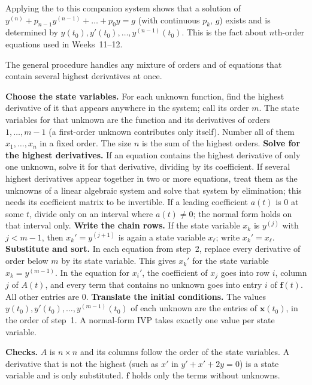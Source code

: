 \documentclass[10pt]{scrartcl}
\newcommand{\vv}[1]{\mathbf{#1}}
\newenvironment{howto}[1]{\begin{mdframed}[style=howtostyle,frametitle={#1}]}{\end{mdframed}}
\begin{document}
\noindent Applying the  to this companion system shows that a solution of $y^{(n)}+p_{n-1}y^{(n-1)}+\dots+p_0y=g$ (with continuous $p_k$, $g$) exists and is determined by $y(t_0),y'(t_0),\dots,y^{(n-1)}(t_0)$. This is the fact about $n$th-order equations used in Weeks~11--12.

The general procedure handles any mixture of orders and of equations that contain several highest derivatives at once.

\begin{howto}{How to put a system in normal form}
  \begin{steps}
    \ii \textbf{Choose the state variables.} For each unknown function, find the highest derivative of it that appears anywhere in the system; call its order $m$. The state variables for that unknown are the function and its derivatives of orders $1,\dots,m-1$ (a first-order unknown contributes only itself). Number all of them $x_1,\dots,x_n$ in a fixed order. The size $n$ is the sum of the highest orders.
    \ii \textbf{Solve for the highest derivatives.} If an equation contains the highest derivative of only one unknown, solve it for that derivative, dividing by its coefficient. If several highest derivatives appear together in two or more equations, treat them as the unknowns of a linear algebraic system and solve that system by elimination; this needs its coefficient matrix to be invertible. If a leading coefficient $a(t)$ is $0$ at some $t$, divide only on an interval where $a(t)\neq 0$; the normal form holds on that interval only.
    \ii \textbf{Write the chain rows.} If the state variable $x_k$ is $y^{(j)}$ with $j<m-1$, then $x_k'=y^{(j+1)}$ is again a state variable $x_\ell$; write $x_k'=x_\ell$.
    \ii \textbf{Substitute and sort.} In each equation from step~2, replace every derivative of order below $m$ by its state variable. This gives $x_k'$ for the state variable $x_k=y^{(m-1)}$. In the equation for $x_i'$, the coefficient of $x_j$ goes into row $i$, column $j$ of $A(t)$, and every term that contains no unknown goes into entry $i$ of $\vv f(t)$. All other entries are $0$.
    \ii \textbf{Translate the initial conditions.} The values $y(t_0),y'(t_0),\dots,y^{(m-1)}(t_0)$ of each unknown are the entries of $\vv x(t_0)$, in the order of step~1. A normal-form IVP takes exactly one value per state variable.
  \end{steps}
  \textbf{Checks.} $A$ is $n\times n$ and its columns follow the order of the state variables. A derivative that is not the highest (such as $x'$ in $y'+x'+2y=0$) is a state variable and is only substituted. $\vv f$ holds only the terms without unknowns.
\end{howto}
\end{document}
